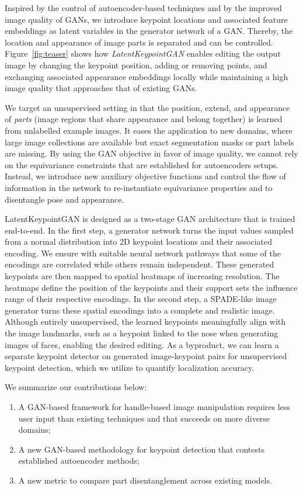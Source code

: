 \documentclass[10pt, conference, compsocconf]{IEEEtran}
\begin{document}
Inspired by the control of autoencoder-based techniques and by the improved image quality of GANs, we introduce keypoint locations and associated feature embeddings as latent variables in the generator network of a GAN. Thereby, the location and appearance of image parts is separated and can be controlled. Figure~\ref{fig:teaser} shows how \emph{LatentKeypointGAN} enables editing the output image by changing the keypoint position, adding or removing points, and exchanging associated appearance embeddings locally while maintaining a high image quality that approaches that of existing GANs. 

We target an unsupervised setting in that the position, extend, and appearance of \emph{parts} (image regions that share appearance and belong together) is learned from unlabelled example images. It eases the application to new domains, where large image collections are available but exact segmentation masks or part labels are missing.
By using the GAN objective in favor of image quality, we cannot rely on the equivariance constraints that are established for autoencoders setups. Instead, we introduce new auxiliary objective functions and control the flow of information in the network to re-instantiate equivariance properties and to disentangle pose and appearance. 

LatentKeypointGAN is designed as a two-stage GAN architecture that is trained end-to-end. In the first step, a generator network turns the input values sampled from a normal distribution into 2D keypoint locations and their associated encoding. We ensure with suitable neural network pathways that some of the encodings are correlated while others remain independent. These generated keypoints are then mapped to spatial heatmaps of increasing resolution. The heatmaps define the position of the keypoints and their support sets the influence range of their respective encodings. In the second step, a SPADE-like \cite{park2019semantic} image generator turns these spatial encodings into a complete and realistic image. 
Although entirely unsupervised, the learned keypoints meaningfully align with the image landmarks, such as a keypoint linked to the nose when generating images of faces, enabling the desired editing. As a byproduct, we can learn a separate keypoint detector on generated image-keypoint pairs for unsupervised keypoint detection, which we utilize to quantify localization accuracy.

We summarize our contributions below: 
\begin{enumerate}
    \item A GAN-based framework for handle-based image manipulation requires less user input than existing techniques and that succeeds on more diverse domains;
\item A new GAN-based methodology for keypoint detection that contests established autoencoder methods;
\item A new metric to compare part disentanglement across existing models.
\end{enumerate}
\end{document}
